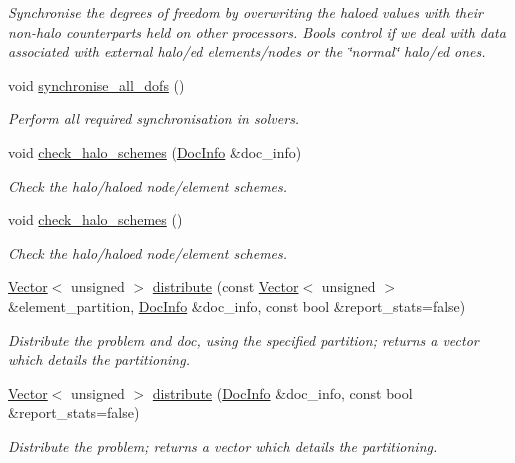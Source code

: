\begin{DoxyCompactItemize}
\begin{DoxyCompactList}\small\item\em Synchronise the degrees of freedom by overwriting the haloed values with their non-\/halo counterparts held on other processors. Bools control if we deal with data associated with external halo/ed elements/nodes or the \char`\"{}normal\char`\"{} halo/ed ones. \end{DoxyCompactList}\item 
void \hyperlink{classoomph_1_1Problem_a5d9a3ba5696a7bcd275223ff16b7392e}{synchronise\+\_\+all\+\_\+dofs} ()
\begin{DoxyCompactList}\small\item\em Perform all required synchronisation in solvers. \end{DoxyCompactList}\item 
void \hyperlink{classoomph_1_1Problem_a93dde63729e7cd332edc1f8904a80649}{check\+\_\+halo\+\_\+schemes} (\hyperlink{classoomph_1_1DocInfo}{Doc\+Info} \&doc\+\_\+info)
\begin{DoxyCompactList}\small\item\em Check the halo/haloed node/element schemes. \end{DoxyCompactList}\item 
void \hyperlink{classoomph_1_1Problem_a8dd5cb241ce6218fb476931e0879d7c8}{check\+\_\+halo\+\_\+schemes} ()
\begin{DoxyCompactList}\small\item\em Check the halo/haloed node/element schemes. \end{DoxyCompactList}\item 
\hyperlink{classoomph_1_1Vector}{Vector}$<$ unsigned $>$ \hyperlink{classoomph_1_1Problem_aa35e1adc0fdf14b217c7b608eb9cf20b}{distribute} (const \hyperlink{classoomph_1_1Vector}{Vector}$<$ unsigned $>$ \&element\+\_\+partition, \hyperlink{classoomph_1_1DocInfo}{Doc\+Info} \&doc\+\_\+info, const bool \&report\+\_\+stats=false)
\begin{DoxyCompactList}\small\item\em Distribute the problem and doc, using the specified partition; returns a vector which details the partitioning. \end{DoxyCompactList}\item 
\hyperlink{classoomph_1_1Vector}{Vector}$<$ unsigned $>$ \hyperlink{classoomph_1_1Problem_a9bab7c41bf5d6d053259ff10920d7303}{distribute} (\hyperlink{classoomph_1_1DocInfo}{Doc\+Info} \&doc\+\_\+info, const bool \&report\+\_\+stats=false)
\begin{DoxyCompactList}\small\item\em Distribute the problem; returns a vector which details the partitioning. \end{DoxyCompactList}\item 

\end{DoxyCompactItemize}
